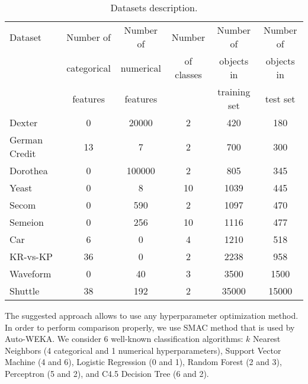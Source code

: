 \documentclass{svproc}
\begin{document}
\begin{table}[t]
\caption{Datasets description.}\label{tab:dat}
\begin{center}
\begin{tabular}{|l|c|c|c|c|c|}
\hline
Dataset & Number of        & Number of    &  Number    & Number of       &  Number of \\  
        & categorical      & numerical    & of classes & objects in      &  objects in  \\
        & features         & features     &            & training set    &  test set  \\
\hline
Dexter & 0 & 20000 & 2 & 420 & 180 \\
\hline
German Credit & 13 & 7 & 2 & 700 & 300 \\
\hline
Dorothea & 0 & 100000 & 2 & 805 & 345 \\
\hline
Yeast & 0 & 8 & 10 & 1039 & 445 \\
\hline
Secom & 0 & 590 & 2 & 1097 & 470 \\
\hline
Semeion & 0 & 256 & 10 & 1116 & 477 \\ 
\hline
Car & 6 & 0 & 4 & 1210 & 518 \\
\hline
KR-vs-KP & 36 & 0 & 2 & 2238 & 958 \\
\hline
Waveform & 0 & 40 & 3 & 3500 & 1500 \\
\hline
Shuttle & 38 & 192 & 2 & 35000 & 15000 \\
\hline
\end{tabular}
\end{center}
\end{table}

The suggested approach allows to use any hyperparameter optimization method. In order to perform comparison properly, we use SMAC method that is used by Auto-WEKA. We consider 6 well-known classification algorithms: $k$ Nearest Neighbors (4 categorical and 1 numerical hyperparameters), Support Vector Machine (4 and 6), Logistic Regression (0 and 1), Random Forest (2 and 3), Perceptron (5 and 2), and C4.5 Decision Tree (6 and 2). %

\end{document}
